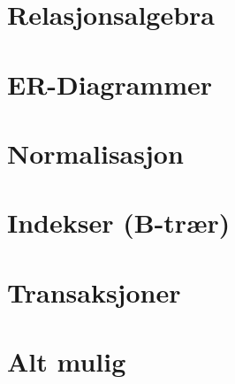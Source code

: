 \section{Relasjonsalgebra}
\section{ER-Diagrammer}
\section{Normalisasjon}
\section{Indekser (B-trær)}
\section{Transaksjoner}
\section{Alt mulig}



